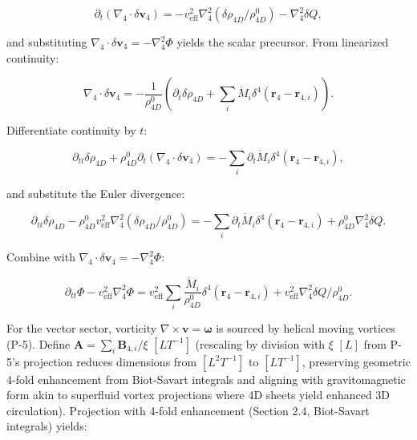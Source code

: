 \begin{equation}
\partial_t (\nabla_4 \cdot \delta \mathbf{v}_4) = -v_{\text{eff}}^2 \nabla_4^2 (\delta \rho_{4D} / \rho_{4D}^0) - \nabla_4^2 \delta Q,
\end{equation}

and substituting $\nabla_4 \cdot \delta \mathbf{v}_4 = -\nabla_4^2 \Phi$ yields the scalar precursor. From linearized continuity:

\begin{equation}
\nabla_4 \cdot \delta \mathbf{v}_4 = -\frac{1}{\rho_{4D}^0} \left( \partial_t \delta \rho_{4D} + \sum_i \dot{M}_i \delta^4(\mathbf{r}_4 - \mathbf{r}_{4,i}) \right).
\end{equation}

Differentiate continuity by $t$:

\begin{equation}
\partial_{tt} \delta \rho_{4D} + \rho_{4D}^0 \partial_t (\nabla_4 \cdot \delta \mathbf{v}_4) = -\sum_i \partial_t \dot{M}_i \delta^4(\mathbf{r}_4 - \mathbf{r}_{4,i}),
\end{equation}

and substitute the Euler divergence:

\begin{equation}
\partial_{tt} \delta \rho_{4D} - \rho_{4D}^0 v_{\text{eff}}^2 \nabla_4^2 (\delta \rho_{4D} / \rho_{4D}^0) = -\sum_i \partial_t \dot{M}_i \delta^4(\mathbf{r}_4 - \mathbf{r}_{4,i}) + \rho_{4D}^0 \nabla_4^2 \delta Q.
\end{equation}

Combine with $\nabla_4 \cdot \delta \mathbf{v}_4 = -\nabla_4^2 \Phi$:

\begin{equation}
\partial_{tt} \Phi - v_{\text{eff}}^2 \nabla_4^2 \Phi = v_{\text{eff}}^2 \sum_i \frac{\dot{M}_i}{\rho_{4D}^0} \delta^4(\mathbf{r}_4 - \mathbf{r}_{4,i}) + v_{\text{eff}}^2 \nabla_4^2 \delta Q / \rho_{4D}^0.
\end{equation}

For the vector sector, vorticity $\nabla \times \mathbf{v} = \boldsymbol{\omega}$ is sourced by helical moving vortices (P-5). Define $\mathbf{A} = \sum_i \mathbf{B}_{4,i} / \xi$ $[L T^{-1}]$ (rescaling by division with $\xi$ $[L]$ from P-5's projection reduces dimensions from $[L^2 T^{-1}]$ to $[L T^{-1}]$, preserving geometric 4-fold enhancement from Biot-Savart integrals and aligning with gravitomagnetic form akin to superfluid vortex projections where 4D sheets yield enhanced 3D circulation). Projection with 4-fold enhancement (Section 2.4, Biot-Savart integrals) yields:

